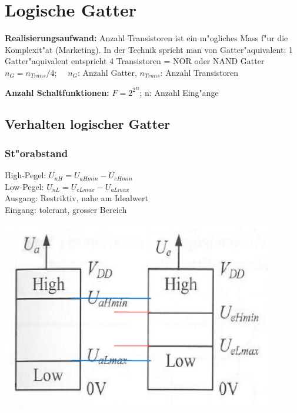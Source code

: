 \section{Logische Gatter}

\textbf{Realisierungsaufwand:} Anzahl Transistoren ist ein m"ogliches Mass f"ur die Komplexit"at (Marketing). In der Technik spricht man von Gatter"aquivalent: 1 Gatter"aquivalent entspricht 4 Transistoren = NOR oder NAND Gatter\\
$n_{G}=n_{Trans}/4$; \ \ $n_{G}$: Anzahl Gatter, $n_{Trans}$: Anzahl Transistoren
 
\textbf{Anzahl Schaltfunktionen:} $F= {2^2}^n$; n: Anzahl Eing"ange

\subsection{Verhalten logischer Gatter}
	\begin{minipage}[c]{8 cm}
		\subsubsection{St"orabstand}
			High-Pegel: $ U_{nH} = U_{aHmin} - U_{eHmin} $\\
			Low-Pegel: $ U_{nL} = U_{eLmax} - U_{aLmax} $\\	
			\newline
			\newline
			Ausgang: Restriktiv, nahe am Idealwert\\
			Eingang: tolerant, grosser Bereich			
	\end{minipage}	
	\begin{minipage}[c]{6 cm}
		\includegraphics[width=0.9\textwidth]{pics/Pegelbereiche_Stoerabstand}
	\end{minipage}


